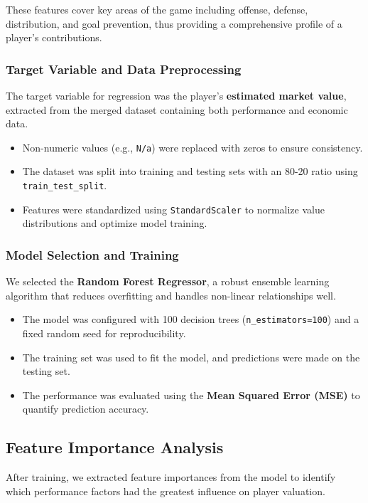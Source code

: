 \documentclass[a4paper,12pt]{article}
\begin{document}
These features cover key areas of the game including offense, defense, distribution, and goal prevention, thus providing a comprehensive profile of a player's contributions.

\subsubsection{Target Variable and Data Preprocessing}

The target variable for regression was the player's \textbf{estimated market value}, extracted from the merged dataset containing both performance and economic data.

\begin{itemize}
    \item Non-numeric values (e.g., \texttt{N/a}) were replaced with zeros to ensure consistency.
    \item The dataset was split into training and testing sets with an 80-20 ratio using \texttt{train\_test\_split}.
    \item Features were standardized using \texttt{StandardScaler} to normalize value distributions and optimize model training.
\end{itemize}

\subsubsection{Model Selection and Training}

We selected the \textbf{Random Forest Regressor}, a robust ensemble learning algorithm that reduces overfitting and handles non-linear relationships well.

\begin{itemize}
    \item The model was configured with 100 decision trees (\texttt{n\_estimators=100}) and a fixed random seed for reproducibility.
    \item The training set was used to fit the model, and predictions were made on the testing set.
    \item The performance was evaluated using the \textbf{Mean Squared Error (MSE)} to quantify prediction accuracy.
\end{itemize}

\subsection{Feature Importance Analysis}

After training, we extracted feature importances from the model to identify which performance factors had the greatest influence on player valuation.
\end{document}

